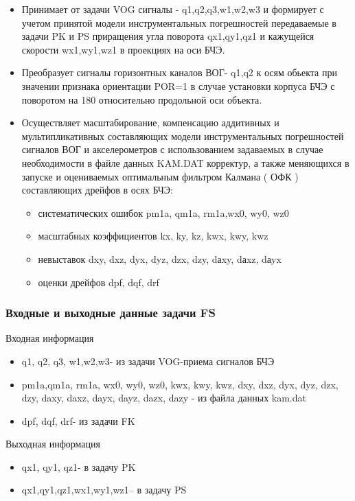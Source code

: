 \begin{itemize}
\item Принимает от задачи VOG сигналы - q1,q2,q3,w1,w2,w3 и формирует с учетом принятой модели  инструментальных погрешностей передаваемые в задачи PK и PS  
приращения угла поворота qx1,qy1,qz1 и кажущейся скорости wx1,wy1,wz1 в проекциях на оси БЧЭ.
\item Преобразует сигналы горизонтных каналов ВОГ- q1,q2  к осям обьекта при значении признака ориентации POR=1 в случае установки корпуса БЧЭ 
с поворотом на 180 относительно продольной оси объекта.
\item Осуществляет масштабирование, компенсацию аддитивных и мультипликативных составляющих модели  инструментальных погрешностей   
сигналов ВОГ и акселерометров с использованием задаваемых в случае необходимости в файле данных KAM.DAT корректур, а также меняющихся в запуске 
и  оцениваемых оптимальным фильтром Калмана ( ОФК ) составляющих дрейфов в осях БЧЭ:  
    \begin{itemize}
\item систематических ошибок  pm1a, qm1a, rm1a,wx0, wy0, wz0
\item масштабных коэффициентов kx, ky, kz,  kwx, kwy, kwz
\item невыставок  dxy, dxz, dyx, dyz, dzx, dzy, dаxy, dаxz, dаyx
\item оценки дрейфов dpf, dqf, drf
    \end{itemize}
\end{itemize}
\subsubsection{Входные и выходные данные задачи FS}
Входная информация
\begin{itemize}
    \item q1, q2, q3, w1,w2,w3- из задачи  VOG-приема сигналов БЧЭ
    \item pm1a,qm1a, rm1a, wx0, wy0, wz0, kwx, kwy, kwz, dxy, dxz, dyx, dyz, dzx, dzy, daxy, daxz, dayx, dayz, dazx, dazy - из файла данных kam.dat
    \item dpf, dqf, drf- из задачи  FK
\end{itemize}
Выходная информация
\begin{itemize}
    \item qx1, qy1, qz1- в задачу PK
    \item qx1,qy1,qz1,wx1,wy1,wz1-- в задачу PS
\end{itemize}
